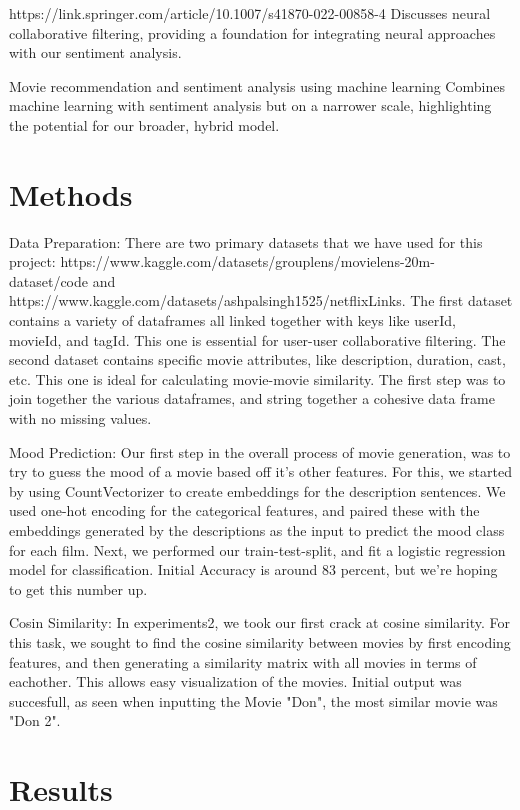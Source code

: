 \documentclass[11pt,a4paper]{article}
\begin{document}
https://link.springer.com/article/10.1007/s41870-022-00858-4
Discusses neural collaborative filtering, providing a foundation for integrating neural approaches with our sentiment analysis.

Movie recommendation and sentiment analysis using machine learning
Combines machine learning with sentiment analysis but on a narrower scale, highlighting the potential for our broader, hybrid model.





\section{Methods}

Data Preparation:
There are two primary datasets that we have used for this project: https://www.kaggle.com/datasets/grouplens/movielens-20m-dataset/code and https://www.kaggle.com/datasets/ashpalsingh1525/netflixLinks. The first dataset contains a variety of dataframes all linked together with keys like userId, movieId, and tagId.
This one is essential for user-user collaborative filtering. The second dataset contains specific movie attributes, like description, duration, cast, etc. This one is ideal for calculating movie-movie similarity. The first step was to join together the various dataframes, and string together a cohesive data frame with 
no missing values.

Mood Prediction:
Our first step in the overall process of movie generation, was to try to guess the mood of a movie based off it's other features. For this, we started by using CountVectorizer to create embeddings for the description sentences. We used one-hot encoding for the categorical features, and paired these with the embeddings generated by the descriptions as the input to predict the mood class for each film.
Next, we performed our train-test-split, and fit a logistic regression model for classification. Initial Accuracy is around 83 percent, but we're hoping to get this number up.

Cosin Similarity:
In experiments2, we took our first crack at cosine similarity. For this task, we sought to find the cosine similarity between movies by first encoding features, and then generating a similarity matrix with all movies in terms of eachother. This allows easy visualization of the movies. Initial output was succesfull, as seen when inputting the Movie "Don", the most similar movie was "Don 2".


\section{Results}
\end{document}
